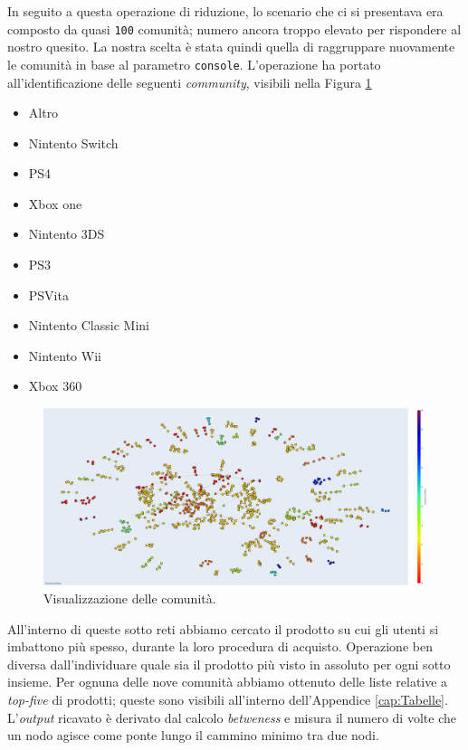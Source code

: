 			In seguito a questa operazione di riduzione, lo scenario che ci si presentava era composto da quasi \verb|100| comunità; numero ancora troppo elevato per rispondere al nostro quesito. La nostra scelta è stata quindi quella di raggruppare nuovamente le comunità in base al parametro \verb|console|. L'operazione ha portato all'identificazione delle seguenti \textit{community}, visibili nella Figura \ref{fig:communities}
			\begin{itemize}			
				\item Altro
				\item Nintento Switch
				\item PS4
				\item Xbox one
				\item Nintento 3DS
				\item PS3
				\item PSVita
				\item Nintento Classic Mini
				\item Nintento Wii
				\item Xbox 360
			\end{itemize}
		
			\begin{figure} [h]
				\includegraphics[width=\textwidth]{Figure/communities}
				\caption{Visualizzazione delle comunità.}
				\label{fig:communities}
			\end{figure} 
		
			All'interno di queste sotto reti abbiamo cercato il prodotto su cui gli utenti si imbattono più spesso, durante la loro procedura di acquisto. Operazione ben diversa dall'individuare quale sia il prodotto più visto in assoluto per ogni sotto insieme. Per ognuna delle nove comunità abbiamo ottenuto delle liste relative a \textit{top-five} di prodotti; queste sono visibili all'interno dell'Appendice \ref{cap:Tabelle}. L'\textit{output} ricavato è derivato dal calcolo \textit{betweness} e misura il numero di volte che un nodo agisce come ponte lungo il cammino minimo tra due nodi.
			